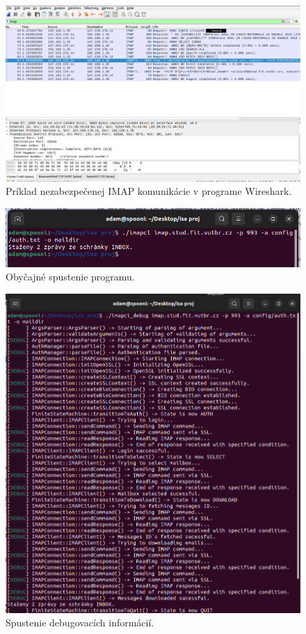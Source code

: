 \documentclass[a4paper, 11pt]{article}
\begin{document}
	\label{subsection:testwireshark}
	\begin{figure}[!ht]
		\centering
		\vspace{1cm}
		\includegraphics[width=0.9\linewidth]{res/test_wireshark.png}
		\caption{Príklad nezabezpečenej IMAP komunikácie v programe Wireshark.}
		\label{figure:testwireshark}
	\end{figure}
	\label{subsection:testbasic}
	\begin{figure}[!ht]
		\centering
		\vspace{1cm}
		\includegraphics[width=0.9\linewidth]{res/test_basic.png}
		\caption{Obyčajné spustenie programu.}
		\label{figure:testbasic}
	\end{figure}
	\label{subsection:testdebug}
	\begin{figure}[!ht]
		\centering
		\vspace{1cm}
		\includegraphics[width=0.9\linewidth]{res/test_debug.png}
		\caption{Spustenie debugovacích informácií.}
		\label{figure:testdebug}
	\end{figure}
\end{document}
